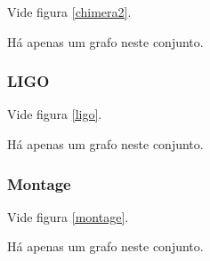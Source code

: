 \documentclass[a4paper,10pt]{article}
\begin{document}
Vide figura \ref{chimera2}.

Há apenas um grafo neste conjunto.

\subsubsection{LIGO}

Vide figura \ref{ligo}.

Há apenas um grafo neste conjunto.

\subsubsection{Montage}

Vide figura \ref{montage}.

Há apenas um grafo neste conjunto.
\end{document}
